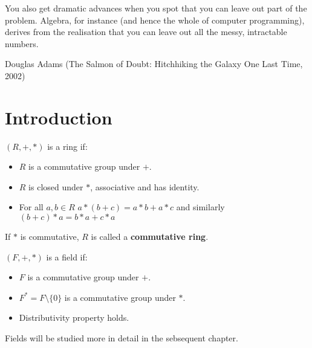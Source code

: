 \epigraph{You also get dramatic advances when you spot that you can leave out part of the problem. Algebra, for instance (and hence the whole of computer programming), derives from the realisation that you can leave out all the messy, intractable numbers.}{Douglas Adams (The Salmon of Doubt: Hitchhiking the Galaxy One Last Time, 2002)}
\par
\section{Introduction}
\begin{definition} \label{def:rings}
  $( R, +, * )$ is a ring if:
  \begin{itemize}
    \item $R$ is a commutative group under $+$.
    \item $R$ is closed under $*$, associative and has identity.
    \item For all $a, b \in R$ $a * (b + c) = a * b + a * c$ and similarly $(b+c) * a = b * a + c * a$
  \end{itemize}
\end{definition}
If $*$ is commutative, $R$ is called a \textbf{commutative ring}.

\begin{definition} \label{def:fields}
  $( F, +, * )$ is a field if:
  \begin{itemize}
    \item $F$ is a commutative group under $+$.
    \item $F^{*} = F \setminus \{ 0 \}$ is a commutative group under $*$.
    \item Distributivity property holds.
  \end{itemize}
\end{definition}
Fields will be studied more in detail in the sebsequent chapter.

